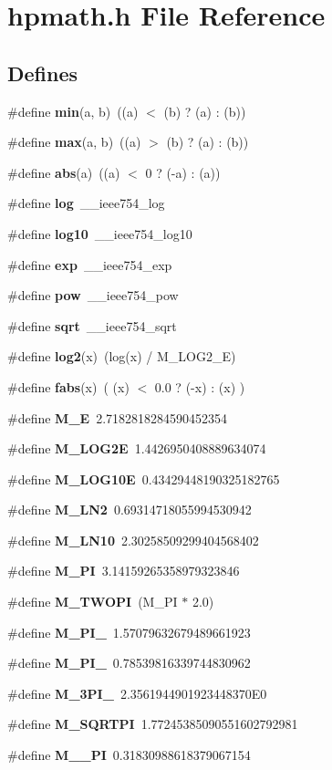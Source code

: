 \section{hpmath.h File Reference}
\label{hpmath_8h}
\subsection*{Defines}
\begin{CompactItemize}
\item 
\#define {\bf min}(a, b)\ ((a) $<$ (b) ? (a) : (b))
\item 
\#define {\bf max}(a, b)\ ((a) $>$ (b) ? (a) : (b))
\item 
\#define {\bf abs}(a)\ ((a) $<$ 0 ? (-a) : (a))
\item 
\#define {\bf log}\ \_\-\_\-ieee754\_\-log
\item 
\#define {\bf log10}\ \_\-\_\-ieee754\_\-log10
\item 
\#define {\bf exp}\ \_\-\_\-ieee754\_\-exp
\item 
\#define {\bf pow}\ \_\-\_\-ieee754\_\-pow
\item 
\#define {\bf sqrt}\ \_\-\_\-ieee754\_\-sqrt
\item 
\#define {\bf log2}(x)\ (log(x) / M\_\-LOG2\_\-E)
\item 
\#define {\bf fabs}(x)\ ( (x) $<$ 0.0 ? (-x) : (x) )
\item 
\#define {\bf M\_\-E}\ 2.7182818284590452354
\item 
\#define {\bf M\_\-LOG2E}\ 1.4426950408889634074
\item 
\#define {\bf M\_\-LOG10E}\ 0.43429448190325182765
\item 
\#define {\bf M\_\-LN2}\ 0.69314718055994530942
\item 
\#define {\bf M\_\-LN10}\ 2.30258509299404568402
\item 
\#define {\bf M\_\-PI}\ 3.14159265358979323846
\item 
\#define {\bf M\_\-TWOPI}\ (M\_\-PI $\ast$ 2.0)
\item 
\#define {\bf M\_\-PI\_}\ 1.57079632679489661923
\item 
\#define {\bf M\_\-PI\_}\ 0.78539816339744830962
\item 
\#define {\bf M\_\-3PI\_}\ 2.3561944901923448370E0
\item 
\#define {\bf M\_\-SQRTPI}\ 1.77245385090551602792981
\item 
\#define {\bf M\_\_\-PI}\ 0.31830988618379067154
\item 

\end{CompactItemize}
